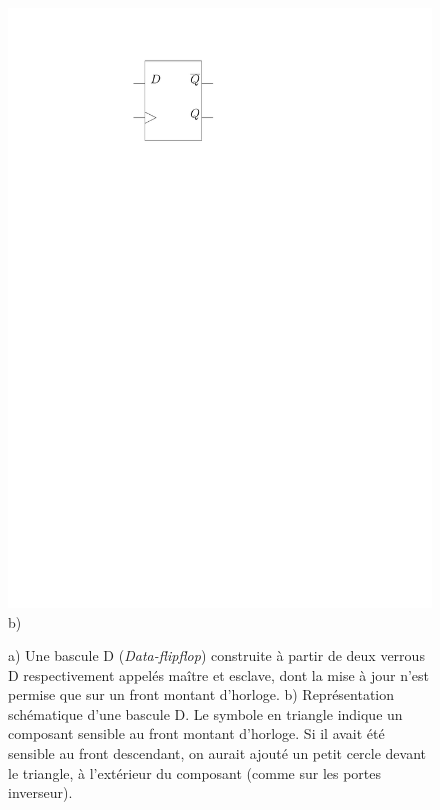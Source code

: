 \begin{figure}[htbp]
\begin{minipage}[c]{.2\linewidth}
\includegraphics[width=\columnwidth]{Figs/flipflop_D_schema.pdf}
\\\centering b)
\end{minipage}
\caption{\label{fig:flipflop_d} a) Une bascule D (\emph{Data-flipflop}) construite à partir de deux verrous D respectivement appelés maître et esclave, dont la mise à jour n'est permise que sur un front montant d'horloge. b) Représentation schématique d'une bascule D. Le symbole en triangle indique un composant sensible au front montant d'horloge. Si il avait été sensible au front descendant, on aurait ajouté un petit cercle devant le triangle, à l'extérieur du composant (comme sur les portes inverseur).}
\end{figure}

